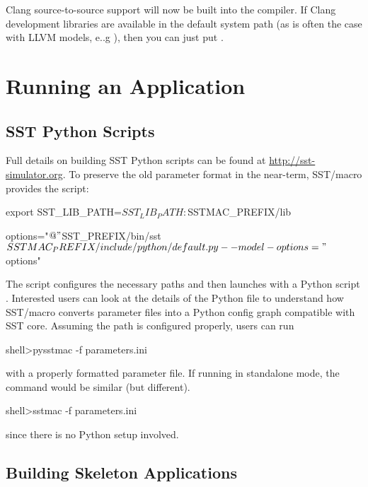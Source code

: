 
Clang source-to-source support will now be built into the  compiler. 
If Clang development libraries are available in the default system path (as is often the case with LLVM models, e..g ),
then you can just put .

\section{Running an Application}\label{sec:building:running}
\subsection{SST Python Scripts}
\label{subsec:SSTPythonScripts}

Full details on building SST Python scripts can be found at \url{http://sst-simulator.org}.  To preserve the old parameter format in the near-term, SST/macro provides the  script:

\begin{ViFile}
export SST_LIB_PATH=$SST_LIB_PATH:$SSTMAC_PREFIX/lib

options="$@"
$SST_PREFIX/bin/sst $SSTMAC_PREFIX/include/python/default.py --model-options="$options"
\end{ViFile}

The script configures the necessary paths and then launches with a Python script .  Interested users can look at the details of the Python file to understand how SST/macro converts parameter files into a Python config graph compatible with SST core.
Assuming the path is configured properly, users can run

\begin{ShellCmd}
shell>pysstmac -f parameters.ini
\end{ShellCmd}
with a properly formatted parameter file. If running in standalone mode, the command would be similar (but different).

\begin{ShellCmd}
shell>sstmac -f parameters.ini
\end{ShellCmd}
since there is no Python setup involved.

\subsection{Building Skeleton Applications}
\label{sec:tutorial:runapp}

